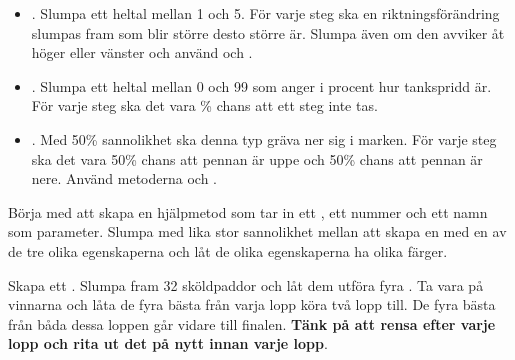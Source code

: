 \begin{itemize}

\item {}. Slumpa ett heltal  mellan 1 och 5. För varje steg ska en riktningsförändring slumpas fram som blir större desto större  är. Slumpa även om den avviker åt höger eller vänster och använd  och .

\item {}. Slumpa ett heltal  mellan 0 och 99 som anger i procent hur tankspridd  är. För varje steg ska det vara \% chans att ett steg inte tas.

\item {}. Med 50\% sannolikhet ska denna typ  gräva ner sig i marken. För varje steg ska det vara 50\% chans att pennan är uppe och 50\% chans att pennan är nere. Använd metoderna  och .

\end{itemize}

\Task {}

\Subtask Börja med att skapa en hjälpmetod  som tar in ett , ett nummer och ett namn som parameter. Slumpa med lika stor sannolikhet mellan att skapa en  med en av de tre olika egenskaperna och låt de olika egenskaperna ha olika färger.

\Subtask Skapa ett . Slumpa fram 32 sköldpaddor och låt dem utföra fyra . Ta vara på vinnarna och låta de fyra bästa från varja lopp köra två lopp till. De fyra bästa från båda dessa loppen går vidare till finalen. \textbf{Tänk på att rensa  efter varje lopp och rita ut det på nytt innan varje lopp}.
